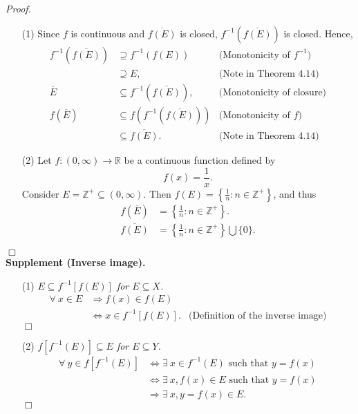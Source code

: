 \documentclass{article}
\begin{document}
\emph{Proof.}
\begin{enumerate}
\item[(1)]
Since $f$ is continuous and $\overline{f(E)}$ is closed,
$f^{-1}(\overline{f(E)})$ is closed.
Hence,
\begin{align*}
f^{-1}(\overline{f(E)})
&\supseteq f^{-1}(f(E))
  & \text{(Monotonicity of $f^{-1}$)} \\
&\supseteq E,
  & \text{(Note in Theorem 4.14)} \\
\overline{E}
&\subseteq f^{-1}(\overline{f(E)}),
  & \text{(Monotonicity of closure)} \\
f(\overline{E})
&\subseteq f(f^{-1}(\overline{f(E)}))
  & \text{(Monotonicity of $f$)} \\
&\subseteq \overline{f(E)}.
  & \text{(Note in Theorem 4.14)}
\end{align*}
\item[(2)]
Let $f: (0, \infty) \to \mathbb{R}$ be a continuous function
defined by $$f(x) = \frac{1}{x}.$$
Consider $E = \mathbb{Z}^+ \subseteq (0, \infty)$.
Then $f(E) = \left\{ \frac{1}{n} : n \in \mathbb{Z}^+ \right\}$,
and thus
\begin{align*}
  f(\overline{E})
  &= \left\{ \frac{1}{n} : n \in \mathbb{Z}^+ \right\}. \\
  \overline{f(E)}
  &= \left\{ \frac{1}{n} : n \in \mathbb{Z}^+ \right\} \bigcup \{0\}.
\end{align*}
\end{enumerate}
$\Box$ \\



\textbf{Supplement (Inverse image).}
\begin{enumerate}
\item[(1)]
\emph{$E \subseteq f^{-1}[f(E)]$ for $E \subseteq X$.}
\begin{align*}
  \forall \: x \in E
  &\Longrightarrow
  f(x) \in f(E)
    & \\
  &\Longleftrightarrow
  x \in f^{-1}[f(E)].
    &\text{(Definition of the inverse image)}
\end{align*}
$\Box$ \\
\item[(2)]
\emph{$f[f^{-1}(E)] \subseteq E$ for $E \subseteq Y$.}
\begin{align*}
  \forall \: y \in f[f^{-1}(E)]
  &\Longleftrightarrow
  \exists \: x \in f^{-1}(E) \text{ such that } y = f(x) \\
  &\Longleftrightarrow
  \exists \: x, f(x) \in E \text{ such that } y = f(x) \\
  &\Longrightarrow
  \exists \: x, y = f(x) \in E.
\end{align*}
$\Box$ \\
\end{enumerate}
\end{document}
